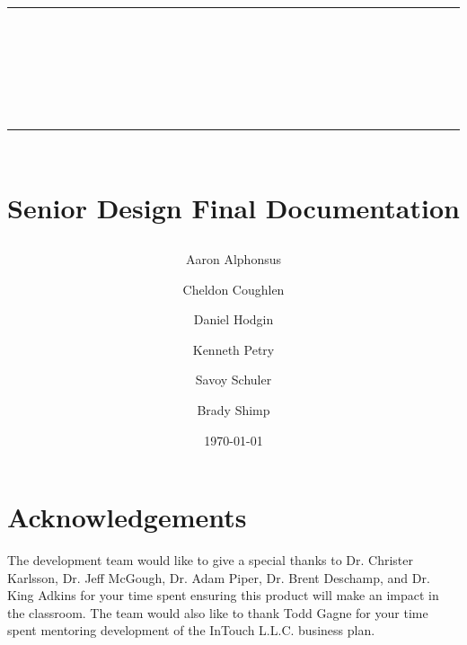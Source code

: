 \documentclass{book}
\title{{\color{SDColor3} \rule{\linewidth}{0.5mm}}\\[2mm] {\huge \bfseries \color{SDColor3} \teamName}\\[-1mm] {\color{SDColor3}\rule{\linewidth}{0.5mm}} \\  \vfill
{\LARGE \bfseries \color{SDColor4} Senior Design Final Documentation }\\  \vfill 
{\color{SDColor3} \teamName} }
\author
{
	\color{SDColor3} Aaron Alphonsus 
	\and \color{SDColor3} Cheldon Coughlen 
	\and \color{SDColor3} Daniel Hodgin 
	\and \color{SDColor3} Kenneth Petry 
	\and \color{SDColor3} Savoy Schuler
	\and \color{SDColor3} Brady Shimp
}
\date{\color{SDColor3} \today}
\begin{document}
\frontmatter

\maketitle

\vspace*{\fill}
\section*{Acknowledgements}
\label{SpecialThanks}  
The development team would like to give a special thanks to Dr. Christer Karlsson, Dr. Jeff McGough, Dr. Adam Piper, Dr. Brent Deschamp, and Dr. King Adkins for your time spent ensuring this product will make an impact in the classroom.  The team would also like to thank Todd Gagne for your time spent mentoring development of the InTouch L.L.C. business plan. 

\vspace*{\fill}

\tableofcontents
{}
\listoffigures
{}
\listoftables
{}

% 

\mainmatter



%
%
\end{document}
